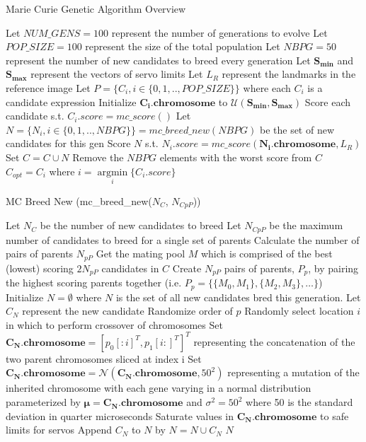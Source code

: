 \documentclass{article}
\DeclareMathOperator*{\argmin}{argmin}
\begin{document}
\listofalgorithms

\begin{algorithm}[H]
	\caption{Marie Curie Genetic Algorithm Overview} 
    \begin{algorithmic}[1]
        \State Let $NUM\_GENS = 100$ represent the number of generations to evolve
        \State Let $POP\_SIZE = 100$ represent the size of the total population
		\State Let $NBPG = 50$ represent the number of new candidates to breed every generation
		\State Let $\bm{S_{min}}$ and $\bm{S_{max}}$ represent the vectors of servo limits
		\State Let $L_R$ represent the landmarks in the reference image
		\State Let $P = \{C_i, i \in \{0, 1, .., POP\_SIZE\}\}$ where each $C_i$ is a candidate expression
			\State Initialize $\mathbf{C_i.chromosome}$ to $\mathcal{U}(\bm{S_{min}}, \bm{S_{max}})$
			\State Score each candidate s.t. $C_i.score = mc\_score()$
		\EndFor
			\State Let $N = \{N_i, i \in \{0, 1, ..,NBPG\}\} = mc\_breed\_new(NBPG)$ be the set of new candidates for this gen
			\State Score $N$ s.t. $N_i.score = mc\_score(\mathbf{N_i.chromosome}, L_R)$
			\State Set $C = C \cup N$
			\State Remove the $NBPG$ elements with the worst score from $C$ 
		\EndFor
		\State \Return $C_{opt} = C_i$ where $i = \argmin\limits_i \{C_i.score\}$
	\end{algorithmic} 
\end{algorithm}

\begin{algorithm}[H]
	\caption{MC Breed New (mc\_breed\_new($N_C$, $N_{CpP}$))}
	\begin{algorithmic}[1]
		\State Let $N_C$ be the number of new candidates to breed
		\State Let $N_{CpP}$ be the maximum number of candidates to breed for a single set of parents
		\State Calculate the number of pairs of parents $N_{pP}$
		\State Get the mating pool $M$ which is comprised of the best (lowest) scoring $2N_{pP}$ candidates in $C$
		\State Create $N_{pP}$ pairs of parents, $P_p$, by pairing the highest scoring parents together (i.e. $P_p = \{\{M_0, M_1\}, \{M_2, M_3\}, \dots\}$)
		\State Initialize $N = \emptyset$ where $N$ is the set of all new candidates bred this generation.
				\State Let $C_N$ represent the new candidate 
				\State Randomize order of $p$
				\State Randomly select location $i$ in which to perform crossover of chromosomes
				\State Set $\mathbf{C_N.chromosome} = [p_0[:i]^T, p_1[i:]^T]^T$ representing the concatenation of the two parent chromosomes sliced at index i
				\State Set $\mathbf{C_N.chromosome} = \mathcal{N}(\mathbf{C_N.chromosome}, 50^2)$ representing a mutation of the inherited chromosome with each gene varying in a normal distribution parameterized by $\bm{\mu} = \mathbf{C_N.chromosome}$ and $\sigma^2 = 50^2$ where 50 is the standard deviation in quarter microseconds
				\State Saturate values in $\mathbf{C_N.chromosome}$ to safe limits for servos
				\State Append $C_N$ to $N$ by $N = N \cup C_N$
			\EndFor
		\EndFor
		\State \Return $N$
	\end{algorithmic} 
\end{algorithm} 
\end{document}
